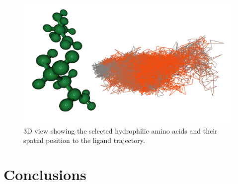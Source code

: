 \documentclass[twocolumn]{bmcart}%
\begin{document}
\begin{figure}[htb]
	\centering
  \includegraphics[width=0.95\linewidth]{img/case_hydro_vs_dist_3d.png}
  \caption{\label{fig:case_hydro_vs_dist_3d} 3D view showing the selected hydrophilic amino acids and their spatial position to the ligand trajectory.}
\end{figure} 









\section*{Conclusions}


\end{document}
